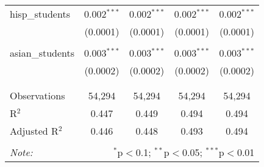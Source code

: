 \begin{table}[!htbp]
\begin{tabular}{@{\extracolsep{-2pt}}lcccc}
 hisp\_students & 0.002$^{***}$ & 0.002$^{***}$ & 0.002$^{***}$ & 0.002$^{***}$ \\ 
  & (0.0001) & (0.0001) & (0.0001) & (0.0001) \\ 
  & & & & \\ 
 asian\_students & 0.003$^{***}$ & 0.003$^{***}$ & 0.003$^{***}$ & 0.003$^{***}$ \\ 
  & (0.0002) & (0.0002) & (0.0002) & (0.0002) \\ 
  & & & & \\ 
\hline \\[-1.8ex] 
Observations & 54,294 & 54,294 & 54,294 & 54,294 \\ 
R$^{2}$ & 0.447 & 0.449 & 0.494 & 0.494 \\ 
Adjusted R$^{2}$ & 0.446 & 0.448 & 0.493 & 0.494 \\ 
\hline 
\hline \\[-1.8ex] 
\textit{Note:}  & \multicolumn{4}{r}{$^{*}$p$<$0.1; $^{**}$p$<$0.05; $^{***}$p$<$0.01} \\ 
\end{tabular} 
\end{table} 
